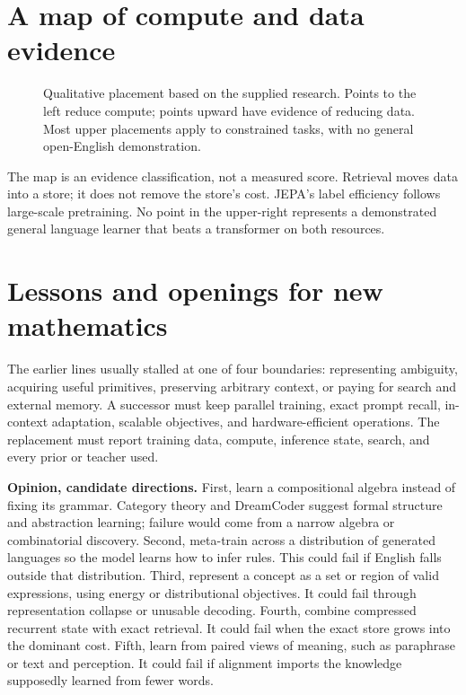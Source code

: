 \section{A map of compute and data evidence}
\begin{figure}[ht]
\centering
{}
\caption{Qualitative placement based on the supplied research. Points to the left reduce compute; points upward have evidence of reducing data. Most upper placements apply to constrained tasks, with no general open-English demonstration.}
\label{fig:map}
\end{figure}
The map is an evidence classification, not a measured score. Retrieval moves data into a store; it does not remove the store's cost. JEPA's label efficiency follows large-scale pretraining. No point in the upper-right represents a demonstrated general language learner that beats a transformer on both resources.

\section{Lessons and openings for new mathematics}
The earlier lines usually stalled at one of four boundaries: representing ambiguity, acquiring useful primitives, preserving arbitrary context, or paying for search and external memory. A successor must keep parallel training, exact prompt recall, in-context adaptation, scalable objectives, and hardware-efficient operations. The replacement must report training data, compute, inference state, search, and every prior or teacher used.

\textbf{Opinion, candidate directions.} First, learn a compositional algebra instead of fixing its grammar. Category theory and DreamCoder suggest formal structure and abstraction learning; failure would come from a narrow algebra or combinatorial discovery. Second, meta-train across a distribution of generated languages so the model learns how to infer rules. This could fail if English falls outside that distribution. Third, represent a concept as a set or region of valid expressions, using energy or distributional objectives. It could fail through representation collapse or unusable decoding. Fourth, combine compressed recurrent state with exact retrieval. It could fail when the exact store grows into the dominant cost. Fifth, learn from paired views of meaning, such as paraphrase or text and perception. It could fail if alignment imports the knowledge supposedly learned from fewer words.

